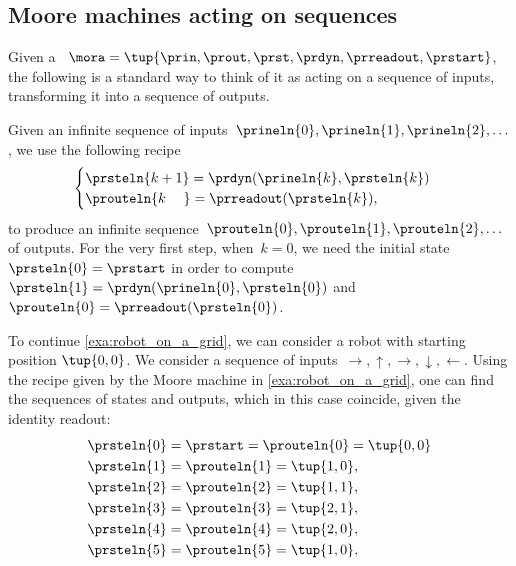 \subsection{Moore machines acting on sequences}

Given a ~$\mora = \tup{\prin, \prout, \prst, \prdyn, \prreadout, \prstart}$, the following is a standard way to think of it as acting on a sequence of inputs, transforming it into a sequence of outputs.

Given an infinite sequence of inputs~$\prineln{0}, \prineln{1}, \prineln{2}, \ldots $, we use the following recipe
\begin{equation}
    \label{eq:Moore-action-recursion}
    \begin{cases}
        \prsteln{k+1} = \prdyn(\prineln{k}, \prsteln{k}) \\
        \prouteln{k\phantom{+1}} = \prreadout(\prsteln{k}),
    \end{cases}
\end{equation}
to produce an infinite sequence~$\prouteln{0}, \prouteln{1}, \prouteln{2}, \ldots$ of outputs.
For the very first step, when~$k = 0$, we need the initial state~$\prsteln{0} = \prstart$ in order to compute~$\prsteln{1} = \prdyn(\prineln{0}, \prsteln{0})$ and~$\prouteln{0} = \prreadout(\prsteln{0})$.

\begin{example}
    To continue \cref{exa:robot_on_a_grid}, we can consider a robot with starting position $\tup{0,0}$.
    We consider a sequence of inputs~$\rightarrow,\uparrow,\rightarrow,\downarrow,\leftarrow$.
    Using the recipe given by the Moore machine in \cref{exa:robot_on_a_grid}, one can find the sequences of states and outputs, which in this case coincide, given the identity readout:
    \begin{equation*}
        \begin{aligned}
            \prsteln{0} & =\prstart=\prouteln{0}=\tup{0,0} \\
            \prsteln{1} & =\prouteln{1}=\tup{1,0}, \\
            \prsteln{2} & =\prouteln{2}=\tup{1,1}, \\
            \prsteln{3} & =\prouteln{3}=\tup{2,1}, \\
            \prsteln{4} & =\prouteln{4}=\tup{2,0}, \\
            \prsteln{5} & =\prouteln{5}=\tup{1,0},
        \end{aligned}
    \end{equation*}
\end{example}

